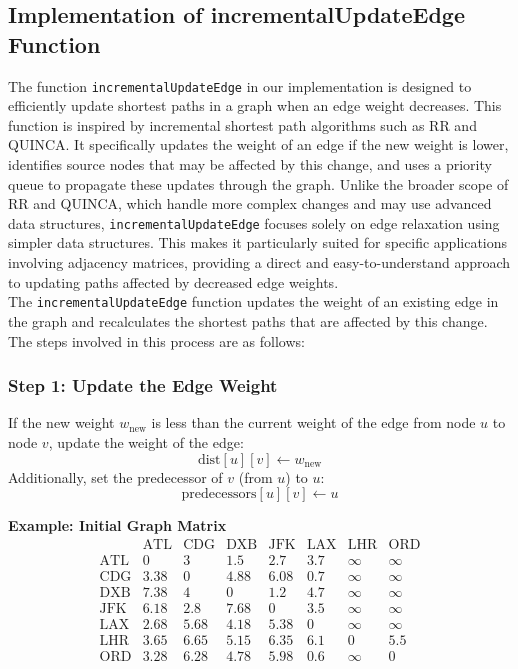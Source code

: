 \documentclass[conference]{IEEEtran}
\begin{document}
\subsection*{Implementation of incrementalUpdateEdge Function}

The function \texttt{incrementalUpdateEdge} in our implementation is designed to efficiently update shortest paths in a graph when an edge weight decreases. This function is inspired by incremental shortest path algorithms such as RR and QUINCA. It specifically updates the weight of an edge if the new weight is lower, identifies source nodes that may be affected by this change, and uses a priority queue to propagate these updates through the graph. Unlike the broader scope of RR and QUINCA, which handle more complex changes and may use advanced data structures, \texttt{incrementalUpdateEdge} focuses solely on edge relaxation using simpler data structures. This makes it particularly suited for specific applications involving adjacency matrices, providing a direct and easy-to-understand approach to updating paths affected by decreased edge weights.
\\

The \texttt{incrementalUpdateEdge} function updates the weight of an existing edge in the graph and recalculates the shortest paths that are affected by this change. The steps involved in this process are as follows:

\subsubsection*{Step 1: Update the Edge Weight}
If the new weight \( w_{\text{new}} \) is less than the current weight of the edge from node \( u \) to node \( v \), update the weight of the edge:
\[
\text{dist}[u][v] \leftarrow w_{\text{new}}
\]
Additionally, set the predecessor of \( v \) (from \( u \)) to \( u \):
\[
\text{predecessors}[u][v] \leftarrow u
\]

\textbf{Example: Initial Graph Matrix}
\[
\begin{array}{c|ccccccc}
     & \text{ATL} & \text{CDG} & \text{DXB} & \text{JFK} & \text{LAX} & \text{LHR} & \text{ORD} \\
\hline
\text{ATL} & 0 & 3 & 1.5 & 2.7 & 3.7 & \infty & \infty \\
\text{CDG} & 3.38 & 0 & 4.88 & 6.08 & 0.7 & \infty & \infty \\
\text{DXB} & 7.38 & 4 & 0 & 1.2 & 4.7 & \infty  & \infty \\
\text{JFK} & 6.18 & 2.8 & 7.68 & 0 & 3.5 & \infty & \infty \\
\text{LAX} & 2.68 & 5.68 & 4.18 & 5.38 & 0 & \infty & \infty \\
\text{LHR} & 3.65 & 6.65 & 5.15 & 6.35 & 6.1 & 0 & 5.5 \\
\text{ORD} & 3.28 & 6.28 & 4.78 & 5.98 & 0.6 & \infty & 0 \\
\end{array}
\]
\\
\end{document}

